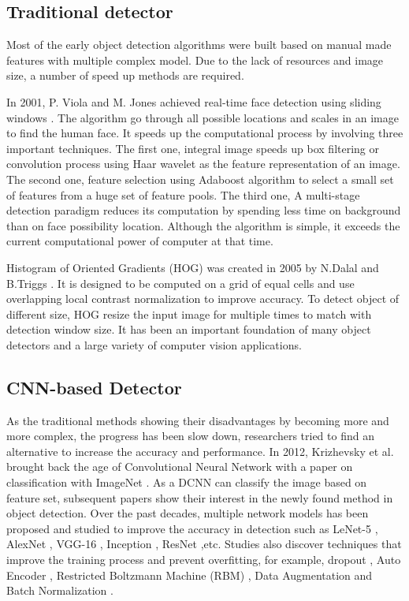 \subsection{Traditional detector}
Most of the early object detection algorithms were built based on manual made features with multiple complex model. Due to the lack of resources and image size, a number of speed up methods are required.

In 2001, P. Viola and M. Jones achieved real-time face detection using sliding windows \cite{VJ1,VJ2}. The algorithm go through all possible locations and scales in an image to find the human face. It speeds up the computational process by involving three important techniques. The first one, integral image speeds up box filtering or convolution process using Haar wavelet as the feature representation of an image. The second one, feature selection using Adaboost algorithm to select a small set of features from a huge set of feature pools. The third one, A multi-stage detection paradigm reduces its computation by spending less time on background than on face possibility location. Although the algorithm is simple, it exceeds the current computational power of computer at that time. 

Histogram of Oriented Gradients (HOG) was created in 2005 by N.Dalal and B.Triggs \cite{HOG}. It is designed to be computed on a grid of equal cells and use overlapping local contrast normalization to improve accuracy. To detect object of different size, HOG resize the input image for multiple times to match with detection window size. It has been an important foundation of many object detectors and a large variety of computer vision applications.\cite{HOG1,HOG2}

\subsection{CNN-based Detector}
As the traditional methods showing their disadvantages by becoming more and more complex, the progress has been slow down, researchers tried to find an alternative to increase the accuracy and performance. In 2012, Krizhevsky et al. brought back the age of Convolutional Neural Network with a paper on classification with ImageNet \cite{16}. As a DCNN can classify the image based on feature set, subsequent papers show their interest in the newly found method in object detection. Over the past decades, multiple network models has been proposed and studied to improve the accuracy in detection such as LeNet-5 \cite{19}, AlexNet \cite{20}, VGG-16 \cite{21}, Inception \cite{22,23}, ResNet \cite{24},etc. Studies also discover techniques that improve the training process and prevent overfitting, for example, dropout \cite{20}, Auto Encoder \cite{25}, Restricted Boltzmann Machine (RBM) \cite{26}, Data Augmentation \cite{27} and Batch Normalization \cite{28}.

